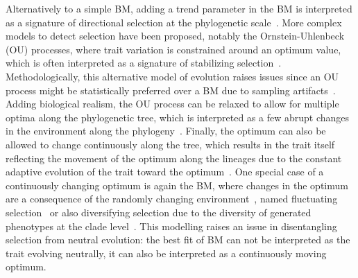 \documentclass{article}
\begin{document}
Alternatively to a simple BM, adding a trend parameter in the BM is interpreted as a signature of directional selection at the phylogenetic scale~\citep{silvestro_early_2019}.
More complex models to detect selection have been proposed, notably the Ornstein-Uhlenbeck (OU) processes, where trait variation is constrained around an optimum value, which is often interpreted as a signature of stabilizing selection~\citep{hansen_stabilizing_1997, butler_phylogenetic_2004, beaulieu_modeling_2012}.
Methodologically, this alternative model of evolution raises issues since an OU process might be statistically preferred over a BM due to sampling artifacts~\citep{silvestro_measurement_2015, cooper_cautionary_2016, price_detecting_2022}.
Adding biological realism, the OU process can be relaxed to allow for multiple optima along the phylogenetic tree, which is interpreted as a few abrupt changes in the environment along the phylogeny~\citep{ingram_surface_2013, uyeda_novel_2014, khabbazian_fast_2016, mitov_fast_2020, grabowski_cautionary_2023}.
Finally, the optimum can also be allowed to change continuously along the tree, which results in the trait itself reflecting the movement of the optimum along the lineages due to the constant adaptive evolution of the trait toward the optimum~\citep{hansen_translating_1996, hansen_three_2024}.
One special case of a continuously changing optimum is again the BM, where changes in the optimum are a consequence of the randomly changing environment~\citep{hansen_comparative_2008}, named fluctuating selection~\citep{holstad_evolvability_2024} or also diversifying selection due to the diversity of generated phenotypes at the clade level~\citep{latrille_detecting_2024}.
This modelling raises an issue in disentangling selection from neutral evolution: the best fit of BM can not be interpreted as the trait evolving neutrally, it can also be interpreted as a continuously moving optimum.
\end{document}

